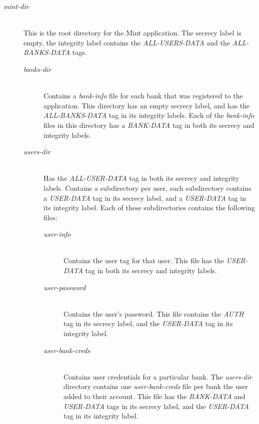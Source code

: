 \begin{description}
  \item[\emph{mint-dir}] \ \\
    This is the root directory for the Mint 
    application.
    The secrecy label is empty, the integrity 
    label contains the \emph{ALL-USERS-DATA} and
    the \emph{ALL-BANKS-DATA} tags.
  \begin{description}
    \item[\emph{banks-dir}] \ \\
      Contains a \emph{bank-info} file for each 
      bank that was registered to the 
      application. This 
      directory has an empty secrecy label, and 
      has the \emph{ALL-BANKS-DATA} tag in its 
      integrity labels.
      Each of the \emph{bank-info} files in 
      this directory has a \emph{BANK-DATA} 
      tag in both its secrecy and integrity 
      labels.
    \item[\emph{users-dir}] \ \\
      Has the \emph{ALL-USER-DATA} tag in both 
      its secrecy and integrity labels. Contains 
      a subdirectory per user, each subdirectory 
      contains a \emph{USER-DATA} tag in its 
      secrecy label, and a \emph{USER-DATA} tag 
      in its integrity label.
      Each of these subdirectories contains the 
      following files:
      \begin{description}
        \item[\emph{user-info}] \ \\
          Contains the user tag for that user.
          This file has the \emph{USER-DATA} tag 
          in both its secrecy and integrity labels.
        \item[\emph{user-password}] \ \\
          Contains the user's password.
          This file contains the \emph{AUTH} tag in 
          its secrecy label, and the \emph{USER-DATA} 
          tag in its integrity label.
        \item[\emph{user-bank-creds}] \ \\
          Contains user credentials for a particular 
          bank.
          The \emph{users-dir} directory contains 
          one \emph{user-bank-creds} file per bank 
          the user added to their account.
          This file has the \emph{BANK-DATA} and 
          \emph{USER-DATA} tags in its secrecy label, 
          and the \emph{USER-DATA} tag in its 
          integrity label.
      \end{description}
  \end{description}
\end{description}

